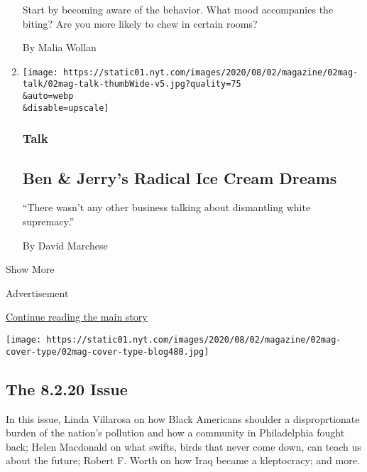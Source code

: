 \begin{enumerate}
  Start by becoming aware of the behavior. What mood accompanies the
  biting? Are you more likely to chew in certain rooms?

  By Malia Wollan
\item
  \href{/interactive/2020/07/27/magazine/ben-jerry-interview.html}{}

  \texttt{[image: https://static01.nyt.com/images/2020/08/02/magazine/02mag-talk/02mag-talk-thumbWide-v5.jpg?quality=75\\\&auto=webp\\\&disable=upscale]}

  \hypertarget{talk-1}{%
  \subsubsection{Talk}\label{talk-1}}

  \hypertarget{ben--jerrys-radical-ice-cream-dreams}{%
  \subsection{Ben \& Jerry's Radical Ice Cream
  Dreams}\label{ben--jerrys-radical-ice-cream-dreams}}

  ``There wasn't any other business talking about dismantling white
  supremacy.''

  By David Marchese
\end{enumerate}

Show More

Advertisement

\protect\hyperlink{after-mid2}{Continue reading the main story}

\href{https://www.nytimes.com/issue/magazine/2020/07/31/the-8220-issue}{}

\texttt{[image: https://static01.nyt.com/images/2020/08/02/magazine/02mag-cover-type/02mag-cover-type-blog480.jpg]}

\href{https://www.nytimes.com/issue/magazine/2020/07/31/the-8220-issue}{}

\hypertarget{the-8220-issue}{%
\subsection{The 8.2.20 Issue}\label{the-8220-issue}}

In this issue, Linda Villarosa on how Black Americans shoulder a
disproprtionate burden of the nation's pollution and how a community in
Philadelphia fought back; Helen Macdonald on what swifts, birds that
never come down, can teach us about the future; Robert F. Worth on how
Iraq became a kleptocracy; and more.


